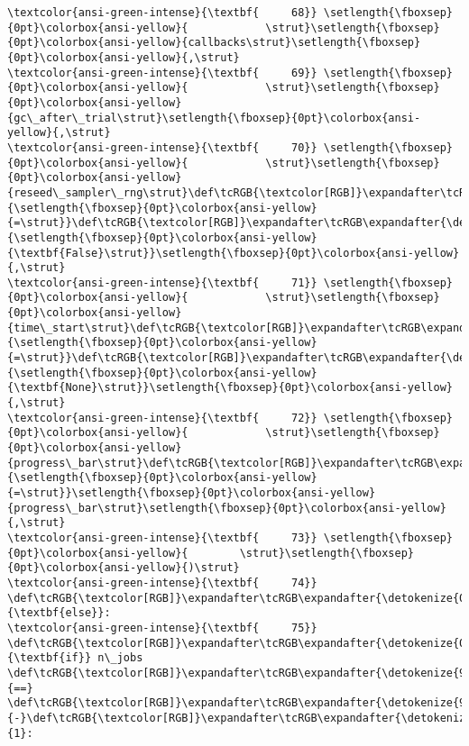 \documentclass[11pt]{article}
\begin{document}
\begin{Verbatim}[commandchars=\\\{\}, frame=single, framerule=2mm, rulecolor=\color{outerrorbackground}]
\textcolor{ansi-green-intense}{\textbf{     68}} \setlength{\fboxsep}{0pt}\colorbox{ansi-yellow}{            \strut}\setlength{\fboxsep}{0pt}\colorbox{ansi-yellow}{callbacks\strut}\setlength{\fboxsep}{0pt}\colorbox{ansi-yellow}{,\strut}
\textcolor{ansi-green-intense}{\textbf{     69}} \setlength{\fboxsep}{0pt}\colorbox{ansi-yellow}{            \strut}\setlength{\fboxsep}{0pt}\colorbox{ansi-yellow}{gc\_after\_trial\strut}\setlength{\fboxsep}{0pt}\colorbox{ansi-yellow}{,\strut}
\textcolor{ansi-green-intense}{\textbf{     70}} \setlength{\fboxsep}{0pt}\colorbox{ansi-yellow}{            \strut}\setlength{\fboxsep}{0pt}\colorbox{ansi-yellow}{reseed\_sampler\_rng\strut}\def\tcRGB{\textcolor[RGB]}\expandafter\tcRGB\expandafter{\detokenize{98,98,98}}{\setlength{\fboxsep}{0pt}\colorbox{ansi-yellow}{=\strut}}\def\tcRGB{\textcolor[RGB]}\expandafter\tcRGB\expandafter{\detokenize{0,135,0}}{\setlength{\fboxsep}{0pt}\colorbox{ansi-yellow}{\textbf{False}\strut}}\setlength{\fboxsep}{0pt}\colorbox{ansi-yellow}{,\strut}
\textcolor{ansi-green-intense}{\textbf{     71}} \setlength{\fboxsep}{0pt}\colorbox{ansi-yellow}{            \strut}\setlength{\fboxsep}{0pt}\colorbox{ansi-yellow}{time\_start\strut}\def\tcRGB{\textcolor[RGB]}\expandafter\tcRGB\expandafter{\detokenize{98,98,98}}{\setlength{\fboxsep}{0pt}\colorbox{ansi-yellow}{=\strut}}\def\tcRGB{\textcolor[RGB]}\expandafter\tcRGB\expandafter{\detokenize{0,135,0}}{\setlength{\fboxsep}{0pt}\colorbox{ansi-yellow}{\textbf{None}\strut}}\setlength{\fboxsep}{0pt}\colorbox{ansi-yellow}{,\strut}
\textcolor{ansi-green-intense}{\textbf{     72}} \setlength{\fboxsep}{0pt}\colorbox{ansi-yellow}{            \strut}\setlength{\fboxsep}{0pt}\colorbox{ansi-yellow}{progress\_bar\strut}\def\tcRGB{\textcolor[RGB]}\expandafter\tcRGB\expandafter{\detokenize{98,98,98}}{\setlength{\fboxsep}{0pt}\colorbox{ansi-yellow}{=\strut}}\setlength{\fboxsep}{0pt}\colorbox{ansi-yellow}{progress\_bar\strut}\setlength{\fboxsep}{0pt}\colorbox{ansi-yellow}{,\strut}
\textcolor{ansi-green-intense}{\textbf{     73}} \setlength{\fboxsep}{0pt}\colorbox{ansi-yellow}{        \strut}\setlength{\fboxsep}{0pt}\colorbox{ansi-yellow}{)\strut}
\textcolor{ansi-green-intense}{\textbf{     74}}     \def\tcRGB{\textcolor[RGB]}\expandafter\tcRGB\expandafter{\detokenize{0,135,0}}{\textbf{else}}:
\textcolor{ansi-green-intense}{\textbf{     75}}         \def\tcRGB{\textcolor[RGB]}\expandafter\tcRGB\expandafter{\detokenize{0,135,0}}{\textbf{if}} n\_jobs \def\tcRGB{\textcolor[RGB]}\expandafter\tcRGB\expandafter{\detokenize{98,98,98}}{==} \def\tcRGB{\textcolor[RGB]}\expandafter\tcRGB\expandafter{\detokenize{98,98,98}}{-}\def\tcRGB{\textcolor[RGB]}\expandafter\tcRGB\expandafter{\detokenize{98,98,98}}{1}:


\end{Verbatim}
\end{document}

